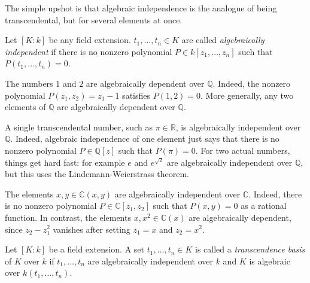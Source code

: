 \noindent
The simple upshot is that algebraic
independence is the analogue of being
transcendental, but for several elements at
once.

\begin{definition}
\label{definition-algebraically-independent}
Let $[K:k]$ be any field extension.
$t_1,…,t_n \in K$ are called
{\it algebraically independent} 
if there is no nonzero polynomial
$P \in k[z_1,…,z_n]$
such that $P(t_1,…,t_n)=0$.
\end{definition}

\begin{example}
\label{example-numbers-algebraically-%
dependent}
The numbers $1$ and $2$ are algebraically
dependent over $\mathbb{Q}$.
Indeed, the nonzero polynomial
$P(z_1,z_2)=z_1-1$ satisfies $P(1,2)=0$.
More generally, any two elements of
$\mathbb{Q}$ are algebraically dependent
over $\mathbb{Q}$.
\end{example}

\begin{example}
\label{example-transcendental-number-%
algebraically-independent}
A single transcendental number, such as
$\pi \in \mathbb{R}$, is algebraically
independent over $\mathbb{Q}$.
Indeed, algebraic independence of one element
just says that there is no nonzero polynomial
$P \in \mathbb{Q}[z]$ such that $P(\pi)=0$.
For two actual numbers, things get hard fast:
for example $e$ and $e^{\sqrt{2}}$ are
algebraically independent over $\mathbb{Q}$,
but this uses the Lindemann-Weierstrass
theorem.
\end{example}

\begin{example}
\label{example-coordinate-functions-%
algebraically-independent}
The elements $x,y \in \mathbb{C}(x,y)$
are algebraically independent over
$\mathbb{C}$.
Indeed, there is no nonzero polynomial
$P \in \mathbb{C}[z_1,z_2]$ such that
$P(x,y)=0$ as a rational function.
In contrast, the elements $x,x^2 \in
\mathbb{C}(x)$ are algebraically dependent,
since $z_2-z_1^2$ vanishes after setting
$z_1=x$ and $z_2=x^2$.
\end{example}

\begin{definition}
\label{definition-transcendence-basis}
Let $[K:k]$ be a field extension.
A set $t_1,\ldots,t_n \in K$ is called
a {\it transcendence basis} of $K$ over $k$
if $t_1,\ldots,t_n$ are algebraically
independent
over $k$ and $K$ is algebraic over
$k(t_1,\ldots,t_n)$.
\end{definition}


